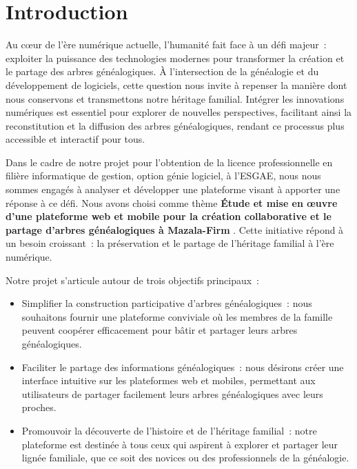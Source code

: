 \chapter*{Introduction}
\label{chap:introduction}
Au cœur de l’ère numérique actuelle, l’humanité fait face à un défi majeur :
exploiter la puissance des technologies modernes pour transformer la création
et le partage des arbres généalogiques. À l’intersection de la généalogie et
du développement de logiciels, cette question nous invite à repenser la
manière dont nous conservons et transmettons notre héritage familial.
Intégrer les innovations numériques est essentiel pour explorer de nouvelles
perspectives, facilitant ainsi la reconstitution et la diffusion des arbres
généalogiques, rendant ce processus plus accessible et interactif pour tous.

Dans le cadre de notre projet pour l’obtention de la licence professionnelle en
filière informatique de gestion, option génie logiciel, à l’\ac{ESGAE}, nous nous
sommes engagés à analyser et développer une plateforme visant à apporter une
réponse à ce défi. Nous avons choisi comme thème
\textbf {\og Étude et mise en œuvre d’une plateforme web et mobile pour la
création collaborative et le partage d’arbres généalogiques à Mazala-Firm \fg}.
Cette initiative répond à un besoin croissant : la préservation et le partage de l’héritage
familial à l’ère numérique.

Notre projet s’articule autour de trois objectifs principaux :
\begin{itemize}
  \item Simplifier la construction participative d’arbres généalogiques :
    nous souhaitons fournir une plateforme conviviale où les membres de
    la famille peuvent coopérer efficacement pour bâtir et partager leurs
    arbres généalogiques.

  \item Faciliter le partage des informations généalogiques : nous désirons
    créer une interface intuitive sur les plateformes web et mobiles,
    permettant aux utilisateurs de partager facilement leurs arbres
    généalogiques avec leurs proches.

  \item Promouvoir la découverte de l’histoire et de l’héritage familial :
    notre plateforme est destinée à tous ceux qui aspirent à explorer et
    partager leur lignée familiale, que ce soit des novices ou des
    professionnels de la généalogie.
\end{itemize}

